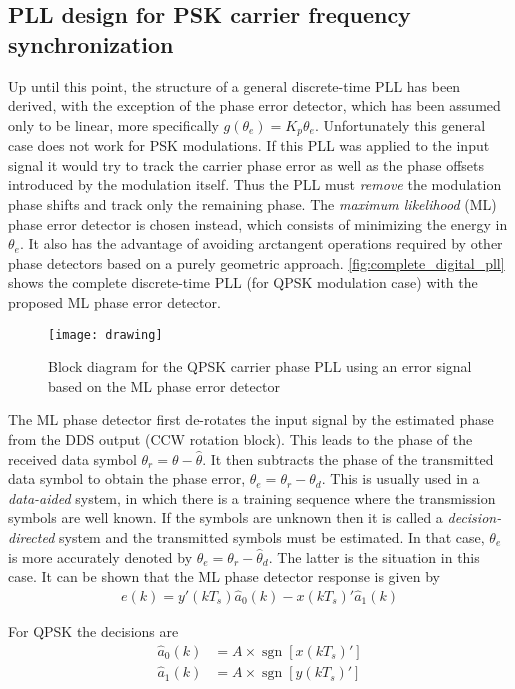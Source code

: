 \subsection{PLL design for PSK carrier frequency synchronization}
Up until this point, the structure of a general discrete-time PLL has been derived, with the exception of the phase error detector, which has been assumed only to be linear, more specifically $g(\theta_e)=K_p\theta_e$. Unfortunately this general case does not work for PSK modulations. If this PLL was applied to the input signal it would try to track the carrier phase error as well as the phase offsets introduced by the modulation itself. Thus the PLL must \emph{remove} the modulation phase shifts and track only the remaining phase. The \emph{maximum likelihood} (ML) phase error detector is chosen instead, which consists of minimizing the energy in $\theta_e$. It also has the advantage of avoiding arctangent operations required by other phase detectors based on a purely geometric approach. \autoref{fig:complete_digital_pll} shows the complete discrete-time PLL (for QPSK modulation case) with the proposed ML phase error detector.
\begin{figure}[ht]
  \centering
  \texttt{[image: drawing]}
  \caption{Block diagram for the QPSK carrier phase PLL using an error signal based on the ML phase error detector}
  \label{fig:complete_digital_pll}
\end{figure}
The ML phase detector first de-rotates the input signal by the estimated phase from the DDS output (CCW rotation block). This leads to the phase of the received data symbol $\theta_r = \theta-\hat\theta$. It then subtracts the phase of the transmitted data symbol to obtain the phase error, $\theta_e=\theta_r-\theta_d$. This is usually used in a \emph{data-aided} system, in which there is a training sequence where the transmission symbols are well known. If the symbols are unknown then it is called a \emph{decision-directed} system and the transmitted symbols must be estimated. In that case, $\theta_e$ is more accurately denoted by $\theta_e=\theta_r-\hat\theta_d$. The latter is the situation in this case. It can be shown \cite{digcomm_discrete_approach} that the ML phase detector response is given by
\begin{align}
  e(k)=y'(kT_s)\hat a_0(k)-x(kT_s)'\hat a_1(k)
\end{align}

For QPSK the decisions are
\begin{align}
\hat a_0(k) &= A\times\operatorname{sgn}\left[x(kT_s)'\right] \\
\hat a_1(k) &= A\times\operatorname{sgn}\left[y(kT_s)'\right]
\end{align}

